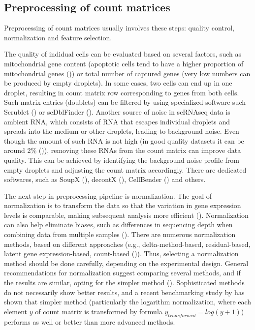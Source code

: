 \subsection{Preprocessing of count matrices}
\label{sec:preprocessingMatrices}

Preprocessing of count matrices usually involves these steps:
quality control, normalization and feature selection.

The quality of indidual cells can be evaluated based on several factors, such as mitochondrial gene content
(apoptotic cells tend to have a higher proportion of mitochondrial genes (\cite{Heumos2023})) or
total number of captured genes (very low numbers can be produced by empty droplets).
In some cases, two cells can end up in one droplet,
resulting in count matrix row corresponding to genes from  both cells.
Such matrix entries (doublets) can be filtered by using specialized software
such Scrublet (\cite{Wolock2019}) or scDblFinder (\cite{Germain2022}).
Another source of noise in scRNAseq data is ambient RNA,
which consists of RNA that escapes individual droplets and spreads into the medium or other droplets,
leading to background noise.
Even though the amount of such RNA is not high (in good quality datasets it can be around 2\% (\cite{Young2020})),
removing these RNAs from the count matrix can improve data quality.
This can be achieved by identifying the background noise profile from empty droplets and
adjusting the count matrix accordingly.
There are dedicated softwares,
such as SoupX (\cite{Young2020}), decontX (\cite{Yang2020}), CellBender (\cite{Fleming2023}) and others.

The next step in preprocessing pipeline is normalization.
The goal of normalization is to transform the data so that the variation in gene expression levels is comparable,
making subsequent analysis more efficient (\cite{Ahlmann2023}).
Normalization can also help eliminate biases,
such as differences in sequencing depth when combining data from multiple samples (\cite{Lingen2024}).
There are numerous normalization methods, based on different approaches
(e.g., delta-method-based, residual-based, latent gene expression-based, count-based (\cite{Ahlmann2023})).
Thus, selecting a normalization method should be done carefully, depending on the experimental design.
General recommendations for normalization suggest comparing several methods,
and if the results are similar, opting for the simpler method (\cite{Lingen2024}).
Sophisticated methods do not necessarily show better results, and a recent benchmarking study by \textcite{Ahlmann2023}
has shown that simpler method (particularly the logarithm normalization,
where each element $y$ of count matrix is transformed by formula $y_{trnasformed} = log(y+1)$)
performs as well or better than more advanced methods.

